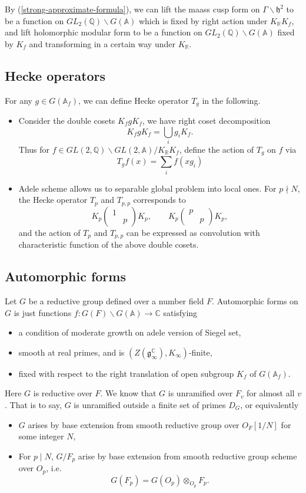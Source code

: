 \documentclass[11pt,reqno]{amsart}
\newcommand{\bma}{\begin{pmatrix}}
\newcommand{\ema}{\end{pmatrix}}
\newcommand{\mk}{\mathfrak}
\def\C{\mathbb{C}}
\def\A{\mathbb{A}}
\def\R{\mathbb{R}}
\def\Q{\mathbb{Q}}
\theoremstyle{definition}
\newcommand{\bit}{\begin{itemize}}
\newcommand{\eit}{\end{itemize}}
\begin{document}
\remark By (\ref{strong-approximate-formula}), we can lift the maass cusp form on $\Gamma\backslash \mathfrak h^2$
to be a function on $GL_2(\Q)\backslash G(\A)$ which is fixed by right action under $K_\R K_f$,
and lift holomorphic modular form to be a function on $GL_2(\Q)\backslash G(\A)$ fixed by $K_f$
and transforming  in a certain way under $K_\R$.

\subsection{Hecke operators}
For any $g\in G(\A_f)$, we can define Hecke operator $T_g$ in the following.
\bit
\item Consider the double cosets $K_fg K_f$, we have right coset decomposition
$$
K_fg K_f=\bigcup_{i}g_iK_f.
$$
Thus for $f\in GL(2,\Q)\backslash GL(2,\A)/K_\R K_f$, define the action of $T_g$  on $f$ via
$$
T_gf(x)=\sum_i f(xg_i)
$$
\item Adele scheme allows us to separable global problem into local ones. For $p\nmid N$,
the Hecke operator $T_p$ and $T_{p,p}$ corresponds to
$$
K_p\bma 1&\\&p\ema K_p,\qquad K_p\bma p&\\&p\ema K_p,
$$
and the action of $T_p$ and $T_{p,p}$ can be expressed as convolution with characteristic function of the above double cosets.
\eit


\subsection{Automorphic forms}
Let $G$ be a reductive group defined over a number field $F$.
Automorphic forms on $G$ is just functions $f:G(F)\backslash G(\A)\rightarrow \C$ satisfying
\bit
\item a condition of moderate growth on adele version of Siegel set,
\item smooth at real primes, and is $(Z(\mk g^\C_\infty),K_\infty)$-finite,
\item fixed with respect to the right translation of open subgroup $K_f$ of $G(\A_f)$.
\eit

Here $G$ is reductive over $F$. We know that $G$ is unramified over $F_v$ for almost all $v$.
That is to say, $G$ is unramified outside a finite set of primes $D_G$, or equivalently
\bit
\item $G$ arises by base extension from smooth reductive group over $O_F[1/N]$ for some  integer $N$,
\item For $p\mid N$, $G/F_p$ arise by base extension from smooth reductive group scheme over $O_p$, i.e.
$$
G(F_p)=G(O_p)\otimes_{O_p}F_p.
$$
\eit
\end{document}
